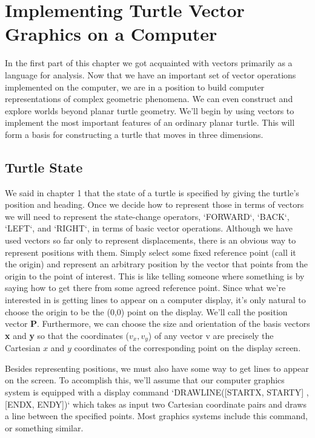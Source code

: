 \documentclass{book}
\begin{document}
\section{Implementing Turtle Vector Graphics on a Computer}

In the first part of this chapter we got acquainted with vectors primarily
as a language for analysis. Now that we have an important set of vector
operations implemented on the computer, we are in a position to build
computer representations of complex geometric phenomena. We can
even construct and explore worlds beyond planar turtle geometry.
We'll begin by using vectors to implement the most important features
of an ordinary planar turtle. This will form a basis for constructing a
turtle that moves in three dimensions.

\subsection{Turtle State}

We said in chapter 1 that the state of a turtle is specified by giving the
turtle's position and heading. Once we decide how to represent those
in terms of vectors we will need to represent the state-change operators,
\textsc{`FORWARD`}, \textsc{`BACK`}, \textsc{`LEFT`}, and \textsc{`RIGHT`}, in terms of basic vector operations.
Although we have used vectors so far only to represent displacements,
there is an obvious way to represent positions with them. Simply select
some fixed reference point (call it the origin) and represent an arbitrary
position by the vector that points from the origin to the point of interest.
This is like telling someone where something is by saying how to get
there from some agreed reference point. Since what we're interested in
is getting lines to appear on a computer display, it's only natural to
choose the origin to be the (0,0) point on the display. We'll call the
position vector \textbf{P}. Furthermore, we can choose the size and orientation
of the basis vectors \textbf{x} and \textbf{y} so that the coordinates ($v_x, v_y$) of any vector
v are precisely the Cartesian $x$ and $y$ coordinates of the corresponding
point on the display screen.

Besides representing positions, we must also have some way to get
lines to appear on the screen. To accomplish this, we'll assume that our
computer graphics system is equipped with a display command \textsc{`DRAWLINE([STARTX, STARTY] , [ENDX, ENDY])`} 
 which takes as input two Cartesian coordinate pairs and draws a line
between the specified points. Most graphics systems include this command, or something similar.
\end{document}
